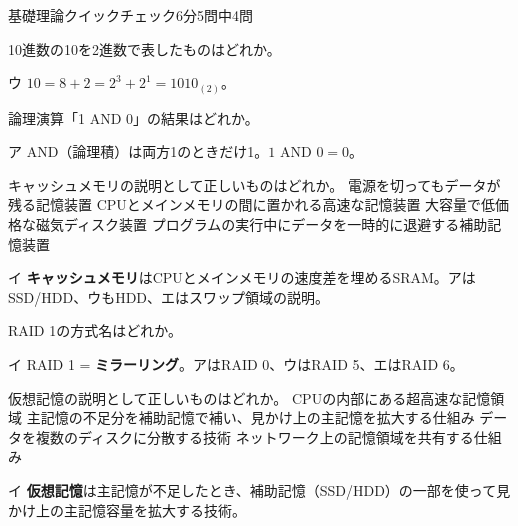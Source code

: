 \begin{timeattack}{基礎理論クイックチェック}{6分}{5問中4問}

\begin{itpmon}[\diffbadge{基}]{10進数の10を2進数で表したものはどれか。}
\end{itpmon}
\begin{kaisetsu}{ウ}
$10 = 8 + 2 = 2^3 + 2^1 = 1010_{(2)}$。
\end{kaisetsu}

\begin{itpmon}[\diffbadge{基}]{論理演算「1 AND 0」の結果はどれか。}
\end{itpmon}
\begin{kaisetsu}{ア}
AND（論理積）は両方1のときだけ1。$1 \text{ AND } 0 = 0$。
\end{kaisetsu}

\begin{itpmon}[\diffbadge{標}]{キャッシュメモリの説明として正しいものはどれか。}
\sentakushi
  {電源を切ってもデータが残る記憶装置}
  {CPUとメインメモリの間に置かれる高速な記憶装置}
  {大容量で低価格な磁気ディスク装置}
  {プログラムの実行中にデータを一時的に退避する補助記憶装置}
\end{itpmon}
\begin{kaisetsu}{イ}
\textbf{キャッシュメモリ}はCPUとメインメモリの速度差を埋めるSRAM。アはSSD/HDD、ウもHDD、エはスワップ領域の説明。
\end{kaisetsu}

\begin{itpmon}[\diffbadge{基}]{RAID 1の方式名はどれか。}
\end{itpmon}
\begin{kaisetsu}{イ}
RAID 1 = \textbf{ミラーリング}。アはRAID 0、ウはRAID 5、エはRAID 6。
\end{kaisetsu}

\begin{itpmon}[\diffbadge{標}]{仮想記憶の説明として正しいものはどれか。}
\sentakushi
  {CPUの内部にある超高速な記憶領域}
  {主記憶の不足分を補助記憶で補い、見かけ上の主記憶を拡大する仕組み}
  {データを複数のディスクに分散する技術}
  {ネットワーク上の記憶領域を共有する仕組み}
\end{itpmon}
\begin{kaisetsu}{イ}
\textbf{仮想記憶}は主記憶が不足したとき、補助記憶（SSD/HDD）の一部を使って見かけ上の主記憶容量を拡大する技術。
\end{kaisetsu}

\end{timeattack}

